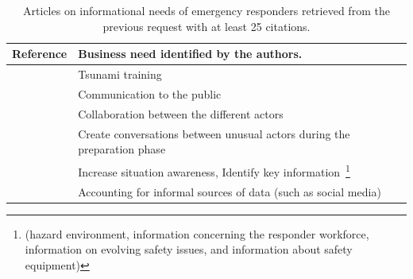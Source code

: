 \begin{table}[bht]
    \centering
    \tabulinesep=1.2mm
    \caption{Articles on informational needs of emergency responders retrieved from the previous request with at least 25 citations.}
    \begin{tabu} to \textwidth {X[1,m]X[3,m]}
        Reference                                                   & Business need identified by the authors.                                                                                                                                                                              \\ [0.5ex]
        \toprule
        \cite{lindellTsunamiPreparednessOregon2010}                 & Tsunami training                                                                                                                                                                                                      \\
        \cite{aloudatRegulationUbiquitousMobile2011}                & Communication to the public                                                                                                                                                                                           \\
        \cite{berlinWhyCollaborationMinimised2011}                  & Collaboration between the different actors                                                                                                                                                                            \\
        \cite{parkerSurfaceWaterFlood2011}                          & Create conversations between unusual actors during the preparation phase                                                                                                                                              \\
        \cite{yangDesignPrinciplesIntegrated2012}                   & Increase situation awareness, Identify key information~\footnote{(hazard environment, information concerning the responder workforce, information on evolving safety issues, and information about safety equipment)} \\
        \cite{tapiaTrustworthyTweetDeeper2013}                      & Accounting for informal sources of data (such as social media)                                                                                                                                                        \\

\end{tabu}
\end{table}
